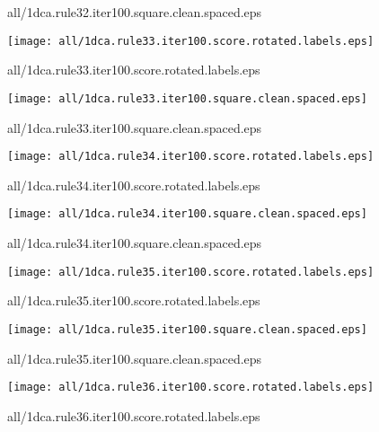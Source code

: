 \documentclass{article}
\begin{document}
{\footnotesize all/1dca.rule32.iter100.square.clean.spaced.eps}
\begin{center}
\begin{minipage}{\textwidth}
\texttt{[image: all/1dca.rule33.iter100.score.rotated.labels.eps]}
\end{minipage}
\end{center}
{\footnotesize all/1dca.rule33.iter100.score.rotated.labels.eps}
\begin{center}
\begin{minipage}{\textwidth}
\texttt{[image: all/1dca.rule33.iter100.square.clean.spaced.eps]}
\end{minipage}
\end{center}
{\footnotesize all/1dca.rule33.iter100.square.clean.spaced.eps}
\begin{center}
\begin{minipage}{\textwidth}
\texttt{[image: all/1dca.rule34.iter100.score.rotated.labels.eps]}
\end{minipage}
\end{center}
{\footnotesize all/1dca.rule34.iter100.score.rotated.labels.eps}
\begin{center}
\begin{minipage}{\textwidth}
\texttt{[image: all/1dca.rule34.iter100.square.clean.spaced.eps]}
\end{minipage}
\end{center}
{\footnotesize all/1dca.rule34.iter100.square.clean.spaced.eps}
\begin{center}
\begin{minipage}{\textwidth}
\texttt{[image: all/1dca.rule35.iter100.score.rotated.labels.eps]}
\end{minipage}
\end{center}
{\footnotesize all/1dca.rule35.iter100.score.rotated.labels.eps}
\begin{center}
\begin{minipage}{\textwidth}
\texttt{[image: all/1dca.rule35.iter100.square.clean.spaced.eps]}
\end{minipage}
\end{center}
{\footnotesize all/1dca.rule35.iter100.square.clean.spaced.eps}
\begin{center}
\begin{minipage}{\textwidth}
\texttt{[image: all/1dca.rule36.iter100.score.rotated.labels.eps]}
\end{minipage}
\end{center}
{\footnotesize all/1dca.rule36.iter100.score.rotated.labels.eps}
\end{document}
